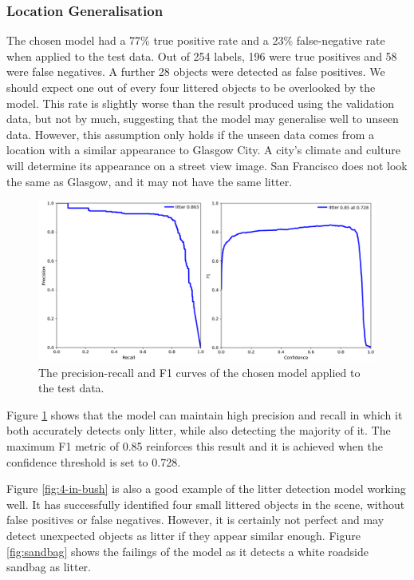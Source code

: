 \documentclass{thesis}
\begin{document}
\subsubsection{Location Generalisation}

The chosen model had a 77\% true positive rate and a 23\% false-negative rate when applied to the test data. Out of 254 labels, 196 were true positives and 58 were false negatives. A further 28 objects were detected as false positives. We should expect one out of every four littered objects to be overlooked by the model. This rate is slightly worse than the result produced using the validation data, but not by much, suggesting that the model may generalise well to unseen data. However, this assumption only holds if the unseen data comes from a location with a similar appearance to Glasgow City. A city's climate and culture will determine its appearance on a street view image. San Francisco does not look the same as Glasgow, and it may not have the same litter.

\begin{figure}[h!]
    \centering
    \includegraphics[scale=0.3]{images/fm-prf1-curves.png}
    \caption{The precision-recall and F1 curves of the chosen model applied to the test data.}
    \label{fig:fm-prf1-curve}
\end{figure}

Figure \ref{fig:fm-prf1-curve} shows that the model can maintain high precision and recall in which it both accurately detects only litter, while also detecting the majority of it. The maximum F1 metric of 0.85 reinforces this result and it is achieved when the confidence threshold is set to 0.728.

Figure \ref{fig:4-in-bush} is also a good example of the litter detection model working well. It has successfully identified four small littered objects in the scene, without false positives or false negatives. However, it is certainly not perfect and may detect unexpected objects as litter if they appear similar enough. Figure \ref{fig:sandbag} shows the failings of the model as it detects a white roadside sandbag as litter.
\end{document}
